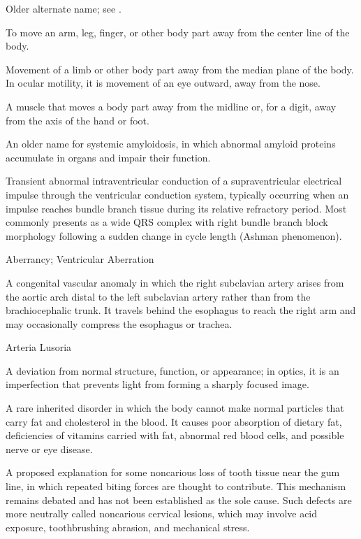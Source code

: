  Older alternate name; see .

 To move an arm, leg, finger, or other body part away from the center line of the body.

 Movement of a limb or other body part away from the median plane of the body. In ocular motility, it is movement of an eye outward, away from the nose.

 A muscle that moves a body part away from the midline or, for a digit, away from the axis of the hand or foot.

 An older name for systemic amyloidosis, in which abnormal amyloid proteins accumulate in organs and impair their function.

 Transient abnormal intraventricular conduction of a supraventricular electrical impulse through the ventricular conduction system, typically occurring when an impulse reaches bundle branch tissue during its relative refractory period. Most commonly presents as a wide QRS complex with right bundle branch block morphology following a sudden change in cycle length (Ashman phenomenon).

\synonyms
Aberrancy; Ventricular Aberration

 A congenital vascular anomaly in which the right subclavian artery arises from the aortic arch distal to the left subclavian artery rather than from the brachiocephalic trunk. It travels behind the esophagus to reach the right arm and may occasionally compress the esophagus or trachea.

\synonyms
Arteria Lusoria

 A deviation from normal structure, function, or appearance; in optics, it is an imperfection that prevents light from forming a sharply focused image.

 A rare inherited disorder in which the body cannot make normal particles that carry fat and cholesterol in the blood. It causes poor absorption of dietary fat, deficiencies of vitamins carried with fat, abnormal red blood cells, and possible nerve or eye disease.

 A proposed explanation for some noncarious loss of tooth tissue near the gum line, in which repeated biting forces are thought to contribute. This mechanism remains debated and has not been established as the sole cause. Such defects are more neutrally called noncarious cervical lesions, which may involve acid exposure, toothbrushing abrasion, and mechanical stress.

